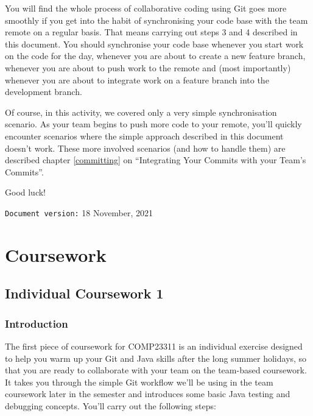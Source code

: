 \documentclass[
]{book}
\begin{document}
You will find the whole process of collaborative coding using Git goes more smoothly if you get into the habit of synchronising your code base with the team remote on a regular basis. That means carrying out steps 3 and 4 described in this document. You should synchronise your code base whenever you start work on the code for the day, whenever you are about to create a new feature branch, whenever you are about to push work to the remote and (most importantly) whenever you are about to integrate work on a feature branch into the development branch.

Of course, in this activity, we covered only a very simple synchronisation scenario. As your team begins to push more code to your remote, you'll quickly encounter scenarios where the simple approach described in this document doesn't work. These more involved scenarios (and how to handle them) are described chapter \ref{committing} on ``Integrating Your Commits with your Team's Commits''.

Good luck!

\texttt{Document\ version:} 18 November, 2021

\hypertarget{part-coursework}{%
\part{Coursework}\label{part-coursework}}

\hypertarget{gitting}{%
\chapter{Individual Coursework 1}\label{gitting}}

\hypertarget{introcw1}{%
\section{Introduction}\label{introcw1}}

The first piece of coursework for COMP23311 is an individual exercise designed to help you warm up your Git and Java skills after the long summer holidays, so that you are ready to collaborate with your team on the team-based coursework. It takes you through the simple Git workflow we'll be using in the team coursework later in the semester and introduces some basic Java testing and debugging concepts. You'll carry out the following steps:
\end{document}

